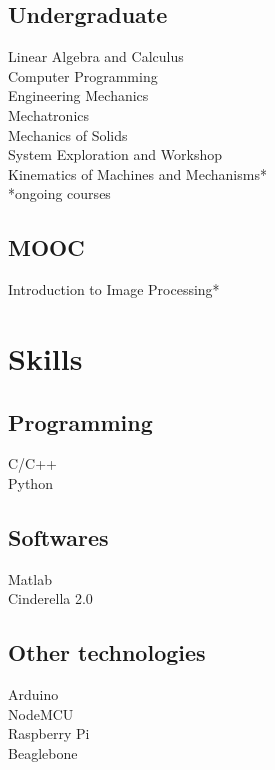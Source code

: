 \documentclass[]{deedy-resume-openfont}
\begin{document}
\begin{minipage}[t]{0.33\textwidth}

\subsection{Undergraduate}

Linear Algebra and Calculus \\
Computer Programming \\
Engineering Mechanics \\
Mechatronics \\
Mechanics of Solids \\
System Exploration and Workshop \\
Kinematics of Machines and Mechanisms*\\
\small{*ongoing courses}\\
\sectionsep

\subsection{MOOC}
Introduction to Image Processing* \\
\sectionsep


\section{Skills}
\subsection{Programming}
\textbullet{}C/C++ \\\textbullet{}   Python \\
\subsection{Softwares}
\textbullet{} Matlab \\\textbullet{} Cinderella 2.0 
\subsection{Other technologies}
\textbullet{} Arduino \\
\textbullet{} NodeMCU \\
\textbullet{} Raspberry Pi \\
\textbullet{} Beaglebone \\

\sectionsep

%
%

\end{minipage} 
\end{document}

